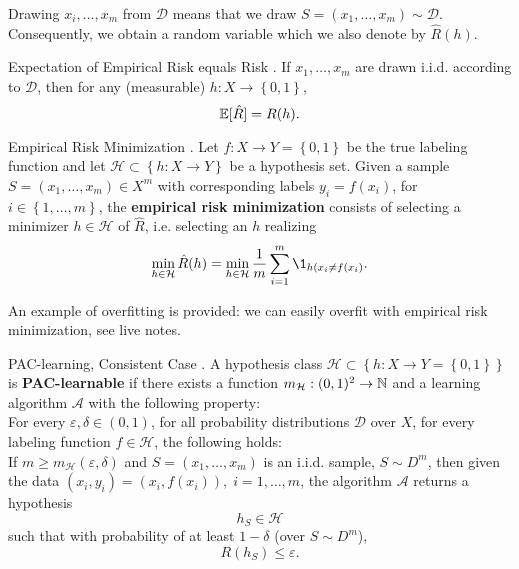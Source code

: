 \documentclass{article}
\begin{document}
Drawing $x_i, \dots, x_m$ from $\mathcal{D}$ means that we draw $S = ( x_1, \dots, x_m) \sim \mathcal{D}$. Consequently, we obtain a random variable which we also denote by $\hat{R}(h)$.

\begin{Lemma}{Expectation of Empirical Risk equals Risk}
.  If $x_1, \dots, x_m$ are drawn i.i.d. according to $\mathcal{D}$, then for any (measurable) $h : X \rightarrow \left\{  0, 1 \right\}$,
\begin{equation}
  \mathbb{E}[ \hat{R}  ] = R(h).
\end{equation}
\end{Lemma}

\begin{Definition}{Empirical Risk Minimization}
.  Let $f : X \rightarrow Y = \left\{ 0, 1 \right\}$ be the true labeling function and let $\mathcal{H} \subset \left\{ h : X \rightarrow Y \right\}$ be a hypothesis set. Given a sample $S = (x_1, \dots, x_m) \in X^m$ with corresponding labels $y_i = f(x_i)$, for $i \in \left\{ 1, \dots, m \right\}$, the \textbf{empirical risk minimization} consists of selecting a minimizer $h \in \mathcal{H}$ of $\hat{R}$, i.e. selecting an $h$ realizing
\begin{equation}
  \min_{h \in \mathcal{H}} \hat{R}(h) = \min_{h \in \mathcal{H}} \frac{1}{m} \sum\limits_{i = 1}^m \1_{h(x_i \neq f(x_i)}.
\end{equation}
\end{Definition}

An example of overfitting is provided: we can easily overfit with empirical risk minimization, see live notes.

\begin{Definition}{PAC-learning, Consistent Case}
  .  A hypothesis class $\mathcal{H} \subset \left\{ h : X \rightarrow Y = \left\{ 0, 1 \right\} \right\}$ is \textbf{PAC-learnable} if there exists a function $m_{\mathcal{H}} : (0, 1)^2 \rightarrow \mathbb{N}$ and a learning algorithm $\mathcal{A}$ with the following property:\\

  For every $\varepsilon, \delta \in (0, 1)$, for all probability distributions $\mathcal{D}$ over $X$, for every labeling function $f \in \mathcal{H}$, the following holds:\\

  If $m \geq m_{\mathcal{H}}(\varepsilon, \delta)$ and $S = (x_1, \dots, x_m)$ is an i.i.d. sample, $S \sim D^m$, then given the data $(x_i, y_i) = (x_i, f(x_i)), \; i = 1, \dots, m$, the algorithm $\mathcal{A}$ returns a hypothesis
  \begin{equation}
    h_S \in \mathcal{H}
  \end{equation}
  such that with probability of at least $1 - \delta$ (over $S \sim D^m$),
  \begin{equation}
    R(h_S) \leq \varepsilon.
  \end{equation}
\end{Definition}
\end{document}
